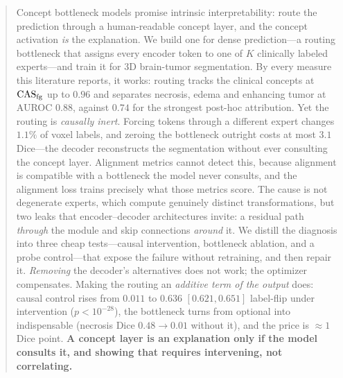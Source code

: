 \begin{abstract}
Concept bottleneck models promise intrinsic interpretability: route the prediction through a
human-readable concept layer, and the concept activation \emph{is} the explanation. We build one
for dense prediction---a routing bottleneck that assigns every encoder token to one of $K$
clinically labeled experts---and train it for 3D brain-tumor segmentation. By every measure this
literature reports, it works: routing tracks the clinical concepts at $\casfg$ up to $0.96$ and
separates necrosis, edema and enhancing tumor at AUROC $0.88$, against $0.74$ for the strongest
post-hoc attribution. Yet the routing is \emph{causally inert}. Forcing tokens through a different
expert changes $1.1\%$ of voxel labels, and zeroing the bottleneck outright costs at most $3.1$
Dice---the decoder reconstructs the segmentation without ever consulting the concept layer.
Alignment metrics cannot detect this, because alignment is compatible with a bottleneck the model
never consults, and the alignment loss trains precisely what those metrics score. The cause is not
degenerate experts, which compute genuinely distinct transformations, but two leaks that
encoder--decoder architectures invite: a residual path \emph{through} the module and skip
connections \emph{around} it. We distill the diagnosis into three cheap tests---causal
intervention, bottleneck ablation, and a probe control---that expose the failure without
retraining, and then repair it. \emph{Removing} the decoder's alternatives does not work; the
optimizer compensates. Making the routing an \emph{additive term of the output} does: causal
control rises from $0.011$ to $\mathbf{0.636}$ $[0.621,0.651]$ label-flip under intervention
($p{<}10^{-28}$), the bottleneck turns from optional into indispensable (necrosis Dice
$0.48\!\to\!0.01$ without it), and the price is ${\approx}1$ Dice point. \textbf{A concept layer
is an explanation only if the model consults it, and showing that requires intervening, not
correlating.}
\end{abstract}
